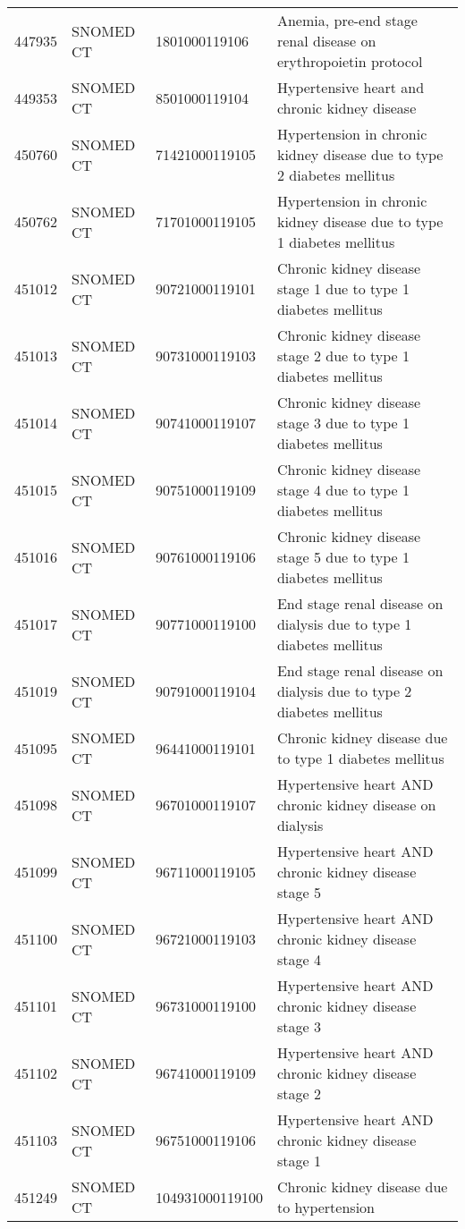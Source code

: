 \begin{table}[ht]
\begin{tabular}{rlll}
  447935 & SNOMED CT & 1801000119106 & Anemia, pre-end stage renal disease on erythropoietin protocol \\ 
  449353 & SNOMED CT & 8501000119104 & Hypertensive heart and chronic kidney disease \\ 
  450760 & SNOMED CT & 71421000119105 & Hypertension in chronic kidney disease due to type 2 diabetes mellitus \\ 
  450762 & SNOMED CT & 71701000119105 & Hypertension in chronic kidney disease due to type 1 diabetes mellitus \\ 
  451012 & SNOMED CT & 90721000119101 & Chronic kidney disease stage 1 due to type 1 diabetes mellitus \\ 
  451013 & SNOMED CT & 90731000119103 & Chronic kidney disease stage 2 due to type 1 diabetes mellitus \\ 
  451014 & SNOMED CT & 90741000119107 & Chronic kidney disease stage 3 due to type 1 diabetes mellitus \\ 
  451015 & SNOMED CT & 90751000119109 & Chronic kidney disease stage 4 due to type 1 diabetes mellitus \\ 
  451016 & SNOMED CT & 90761000119106 & Chronic kidney disease stage 5 due to type 1 diabetes mellitus \\ 
  451017 & SNOMED CT & 90771000119100 & End stage renal disease on dialysis due to type 1 diabetes mellitus \\ 
  451019 & SNOMED CT & 90791000119104 & End stage renal disease on dialysis due to type 2 diabetes mellitus \\ 
  451095 & SNOMED CT & 96441000119101 & Chronic kidney disease due to type 1 diabetes mellitus \\ 
  451098 & SNOMED CT & 96701000119107 & Hypertensive heart AND chronic kidney disease on dialysis \\ 
  451099 & SNOMED CT & 96711000119105 & Hypertensive heart AND chronic kidney disease stage 5 \\ 
  451100 & SNOMED CT & 96721000119103 & Hypertensive heart AND chronic kidney disease stage 4 \\ 
  451101 & SNOMED CT & 96731000119100 & Hypertensive heart AND chronic kidney disease stage 3 \\ 
  451102 & SNOMED CT & 96741000119109 & Hypertensive heart AND chronic kidney disease stage 2 \\ 
  451103 & SNOMED CT & 96751000119106 & Hypertensive heart AND chronic kidney disease stage 1 \\ 
  451249 & SNOMED CT & 104931000119100 & Chronic kidney disease due to hypertension \\ 

\end{tabular}
\end{table}
